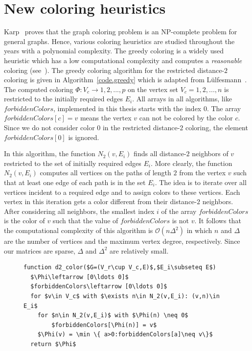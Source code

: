 \documentclass[12pt, twoside,a4paper,toc=bibliography]{scrbook}
\newcommand{\coderef}[1]{Algorithm~\protect\ref{#1}}
\begin{document}
\chapter{New coloring heuristics}
\label{package}
Karp~\cite{karp:1972} proves that the graph coloring problem is an NP-complete problem
for general graphs.
Hence, various coloring heuristics are studied throughout the years with a polynomial complexity.
The greedy coloring is a widely used heuristic which has a low computational complexity
and computes a \textit{reasonable} coloring (see~\cite{spaa14}).
The greedy coloring algorithm for the restricted distance-$2$ coloring
is given in \coderef{code.greedy} which is adapted from Lülfesmann~\cite{Lulfesmann2012Fap}.
The computed coloring $\Phi:V_c\to{1,2,...,p}$ on the vertex set $V_c={1,2,...,n}$
is restricted to the initially required edges $E_i$.
All arrays in all algorithms, like $forbiddenColors$, 
implemented in this thesis starts with the index $0$.
The array $forbiddenColors[c]=v$ means the vertex $v$ can not be colored
by the color $c$. Since we do not consider color $0$ in the restricted
distance-$2$ coloring, the element $forbiddenColors[0]$ is ignored.

In this algorithm, the function $N_2(v,E_i)$ finds all distance-$2$ neighbors
of $v$ restricted to the set of initially required edges $E_i$. 
More clearly, the function $N_2(v,E_i)$ computes 
all vertices on the paths of length $2$ from the vertex $v$
such that at least one edge of each path is in the set $E_i$. 
The idea is to iterate over all vertices incident
to a required edge and to assign colors to these vertices.
Each vertex in this iteration gets a color different from their
distance-$2$ neighbors. 
After considering all neighbors, the smallest index $i$ of the array $forbiddenColors$
is the color of $v$ such that the value of $forbiddenColors$ is not $v$.
It follows that the computational complexity of this algorithm is $\mathcal{O}(n \Delta^2)$ in which $n$
and $\Delta$ are the number of vertices and the maximum vertex degree, respectively.
Since our matrices are sparse, $\Delta$ and $\Delta^2$
are relatively small.

\begin{figure}
\begin{lstlisting}[caption=The greedy algorithm for
the distance-$2$ coloring restricted to the edge set $E_i$
for columns.,label=code.greedy,mathescape]
function d2_color($G=(V_r\cup V_c,E)$,$E_i\subseteq E$)
  $\Phi\leftarrow [0\ldots 0]$
  $forbiddenColors\leftarrow [0\ldots 0]$
  for $v\in V_c$ with $\exists n\in N_2(v,E_i): (v,n)\in E_i$
    for $n\in N_2(v,E_i)$ with $\Phi(n) \neq 0$
        $forbiddenColors[\Phi(n)] = v$
    $\Phi(v) = \min \{ a>0:forbiddenColors[a]\neq v\}$
  return $\Phi$
\end{lstlisting}
\end{figure}
\end{document}
